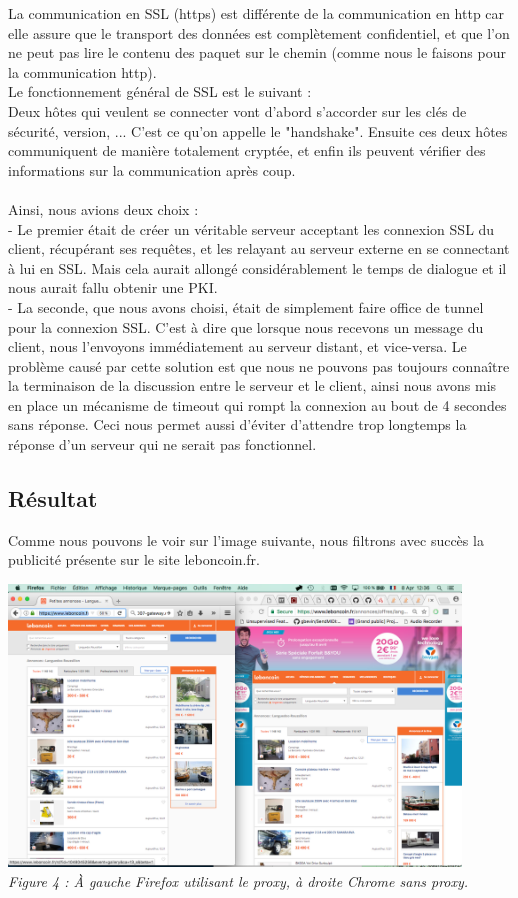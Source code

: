 \documentclass{scrreprt}
\begin{document}
La communication en SSL (https) est différente de la communication en http car elle assure que le transport des données est complètement confidentiel, et que l'on ne peut pas lire le contenu des paquet sur le chemin (comme nous le faisons pour la communication http).\\ Le fonctionnement général de SSL est le suivant : \\
Deux hôtes qui veulent se connecter vont d'abord s'accorder sur les clés de sécurité, version, ... C'est ce qu'on appelle le "handshake". Ensuite ces deux hôtes communiquent de manière totalement cryptée, et enfin ils peuvent vérifier des informations sur la communication après coup.\\\\

Ainsi, nous avions deux choix :\\
- Le premier était de créer un véritable serveur acceptant les connexion SSL du client, récupérant ses requêtes, et les relayant au serveur externe en se connectant à lui en SSL. Mais cela aurait allongé considérablement le temps de dialogue et il nous aurait fallu obtenir une PKI.\\
- La seconde, que nous avons choisi, était de simplement faire office de tunnel pour la connexion SSL. C'est à dire que lorsque nous recevons un message du client, nous l'envoyons immédiatement au serveur distant, et vice-versa. Le problème causé par cette solution est que nous ne pouvons pas toujours connaître la terminaison de la discussion entre le serveur et le client, ainsi nous avons mis en place un mécanisme de timeout qui rompt la connexion au bout de 4 secondes sans réponse. Ceci nous permet aussi d'éviter d'attendre trop longtemps la réponse d'un serveur qui ne serait pas fonctionnel.

\subsection{Résultat}

Comme nous pouvons le voir sur l'image suivante, nous filtrons avec succès la publicité présente sur le site leboncoin.fr.

\begin{center}
  \includegraphics[height=7.5cm]{images/f4.png}
  \\
  \textit{Figure 4 : À gauche Firefox utilisant le proxy, à droite Chrome sans proxy.}
\end{center}
\end{document}
